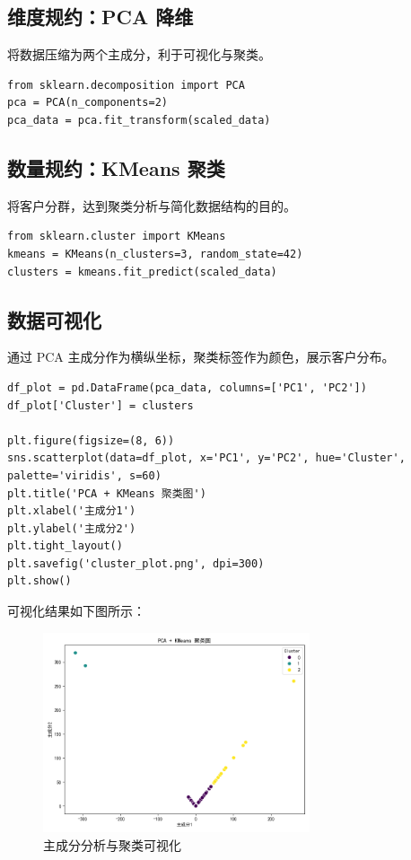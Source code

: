 \documentclass[10pt]{ctexart}
\begin{document}
\subsection{维度规约：PCA 降维}
将数据压缩为两个主成分，利于可视化与聚类。

\begin{lstlisting}
from sklearn.decomposition import PCA
pca = PCA(n_components=2)
pca_data = pca.fit_transform(scaled_data)
\end{lstlisting}

\subsection{数量规约：KMeans 聚类}
将客户分群，达到聚类分析与简化数据结构的目的。

\begin{lstlisting}
from sklearn.cluster import KMeans
kmeans = KMeans(n_clusters=3, random_state=42)
clusters = kmeans.fit_predict(scaled_data)
\end{lstlisting}

\subsection{数据可视化}
通过 PCA 主成分作为横纵坐标，聚类标签作为颜色，展示客户分布。

\begin{lstlisting}
df_plot = pd.DataFrame(pca_data, columns=['PC1', 'PC2'])
df_plot['Cluster'] = clusters

plt.figure(figsize=(8, 6))
sns.scatterplot(data=df_plot, x='PC1', y='PC2', hue='Cluster', palette='viridis', s=60)
plt.title('PCA + KMeans 聚类图')
plt.xlabel('主成分1')
plt.ylabel('主成分2')
plt.tight_layout()
plt.savefig('cluster_plot.png', dpi=300)
plt.show()
\end{lstlisting}

可视化结果如下图所示：

\begin{figure}[H]
    \centering
    \includegraphics[width=0.7\textwidth]{cluster_plot.png}
    \caption{主成分分析与聚类可视化}
\end{figure}
\end{document}
